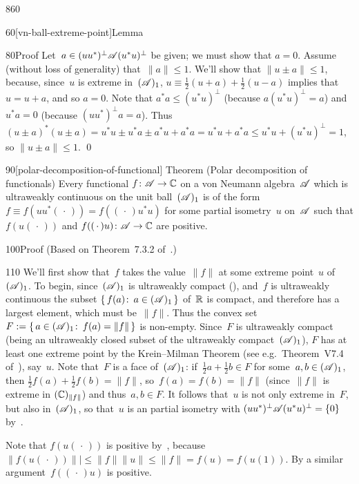 \begin{parsec}{860}
\begin{point}{60}[vn-ball-extreme-point]{Lemma}
\begin{point}{80}{Proof}
Let~$a\in (uu^*)^\perp \mathscr{A} (u^*u)^\perp$
be given; we must show that $a=0$.
Assume (without loss of generality)
that~$\|a\|\leq 1$.
We'll show that $\|u\pm a\|\leq 1$,
because,
since~$u$ is extreme in~$(\mathscr{A})_1$,
$u\equiv \frac{1}{2}(u+a)+\frac{1}{2}(u-a)$
implies that~$u=u+a$, and so $a=0$.
Note that $a^*a \leq (u^*u)^\perp$ (because $a(u^*u)^\perp=a$)
and $u^*a = 0$ (because $(uu^*)^\perp a=a$).
Thus $(u\pm a)^*(u\pm a)
=u^*u \pm u^* a \pm a^* u + a^*a
= u^*u + a^*a \leq u^*u + (u^*u)^\perp = 1$,
so $\|u\pm a\|\leq 1$. \qed
\end{point}
\end{point}
\begin{point}{90}[polar-decomposition-of-functional]%
	{Theorem (Polar decomposition of functionals)}%
Every functional $f\colon \mathscr{A}\to \mathbb{C}$ on a von Neumann algebra~$\mathscr{A}$
which is ultraweakly continuous on
the unit ball~$(\mathscr{A})_1$
is of the form $f\equiv f(uu^*(\,\cdot\,)) = f((\,\cdot\,)u^*u)$
for some partial isometry~$u$ on~$\mathscr{A}$
such that $f(u(\,\cdot\,))$
and $f((\,\cdot\,)u)\colon \mathscr{A}\to\mathbb{C}$
are positive.
\begin{point}{100}{Proof}%
(Based on Theorem~7.3.2 of~\cite{kr}.) 
\begin{point}{110}%
We'll first show that~$f$ takes the value~$\|f\|$
at some extreme point~$u$ of~$(\mathscr{A})_1$.
To begin, since~$(\mathscr{A})_1$ is ultraweakly compact (),
and~$f$ is ultraweakly continuous
the subset $\{\,f(a)\colon\,a\in(\mathscr{A})_1\,\}$
of~$\mathbb{R}$ is compact,
and therefore has a largest element, 
which must be~$\|f\|$.
Thus the convex
set~$F:=\{\,a\in(\mathscr{A})_1\colon\, f(a)=\|f\|\,\}$
is non-empty.
Since~$F$ is ultraweakly compact (being an ultraweakly closed
subset of the ultraweakly compact~$(\mathscr{A})_1$),
$F$ has at least one extreme point
by the Krein--Milman Theorem
(see e.g.~Theorem~V7.4 of~\cite{conway2013}), say~$u$.
Note that~$F$ is a face of~$(\mathscr{A})_1$:
if~$\frac{1}{2}a+\frac{1}{2}b\in F$ for some~$a,b\in(\mathscr{A})_1$,
then $\frac{1}{2}f(a)+\frac{1}{2}f(b) = \|f\|$,
so~$f(a)=f(b)=\|f\|$
(since~$\|f\|$ is extreme in $(\mathbb{C})_{\|f\|}$)
and thus~$a,b\in F$.
It follows that~$u$ is not only extreme in~$F$, but also in~$(\mathscr{A})_1$,
so that~$u$ is an partial isometry with $(uu^*)^\perp\mathscr{A}(u^*u)^\perp=\{0\}$
by~.

Note that $f(u(\,\cdot\,))$
is positive by~, because
$\|f(u(\,\cdot\,))\||\leq\|f\|\|u\|\leq\|f\|=f(u)=f(u(1))$.
By a similar argument~$f((\,\cdot\,)u)$
is positive.


\end{point}
\end{point}
\end{point}
\end{parsec}

